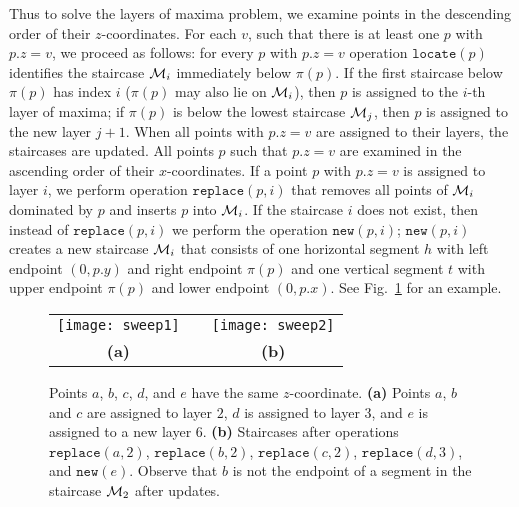 \documentclass[10pt]{llncs}
\def\idtt#1{\ensuremath{\mathtt{#1}}}
\newcommand{\cM}{{\cal M}}
\newcommand{\replace}{\idtt{replace}}
\newcommand{\locate}{\idtt{locate}}
\newcommand{\new}{\idtt{new}}
\begin{document}
Thus to solve the layers of maxima problem, we examine points in the 
descending order of their $z$-coordinates.
For each $v$, such that there is at least one $p$ with $p.z=v$, we proceed 
as follows: for every $p$ with $p.z=v$  operation $\locate(p)$ identifies the 
staircase $\cM_i$ 
immediately below $\pi(p)$. If the first staircase below $\pi(p)$ has index 
$i$ ($\pi(p)$ may also lie on $\cM_i$), then 
$p$ is assigned to the $i$-th layer of maxima; if $\pi(p)$ 
is below the lowest staircase $\cM_{j}$, then $p$ is assigned to the  
new layer $j+1$. 
When all points with $p.z=v$ are assigned to their layers, the staircases 
are updated. All points $p$ such that $p.z=v$ are examined 
in the ascending order of their $x$-coordinates. 
If a point $p$ with $p.z=v$ is assigned to layer $i$, 
we perform operation $\replace(p,i)$ that removes all 
points of $\cM_i$ dominated by $p$ and inserts $p$ into $\cM_i$.
If the staircase $i$ does not exist, then instead of $\replace(p,i)$ 
we perform the operation $\new(p,i)$; $\new(p,i)$ 
creates a new staircase $\cM_i$ that consists of one horizontal segment $h$ 
with left endpoint $(0,p.y)$ and right endpoint $\pi(p)$ and one vertical
segment $t$ with upper endpoint $\pi(p)$ and lower endpoint $(0,p.x)$.
See Fig.~\ref{fig:sweep} for an example. 

\begin{figure}[tbh]
  \centering
  \begin{tabular}{ccc}
  \texttt{[image: sweep1]} & \hspace*{.7cm} &
  \texttt{[image: sweep2]} \\
  {\bf (a)}   &  & {\bf(b)}  \\
  \end{tabular}
  \caption{Points $a$, $b$, $c$, $d$, and $e$ have the same $z$-coordinate. {\bf (a)} Points $a$, $b$ and $c$ are assigned to layer $2$, $d$ is assigned to layer $3$, and $e$ is assigned to a new layer $6$. 
{\bf (b)} Staircases after operations $\replace(a,2)$, $\replace(b,2)$, $\replace(c,2)$, $\replace(d,3)$, and $\new(e)$. Observe that $b$ is not the endpoint of a segment in the staircase $\cM_2$ after updates.
     }
  \label{fig:sweep}
\end{figure}
\end{document}
